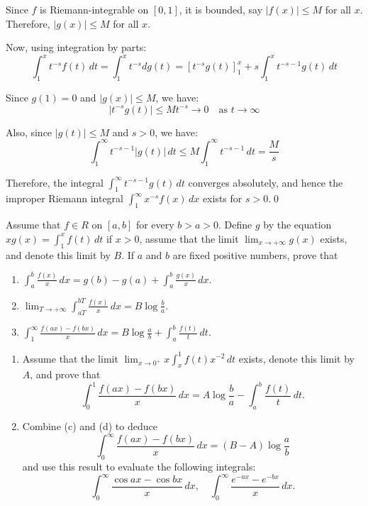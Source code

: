 Since $f$ is Riemann-integrable on $[0, 1]$, it is bounded, say $|f(x)| \leq M$ for all $x$. Therefore, $|g(x)| \leq M$ for all $x$.

Now, using integration by parts:
\[\int_{1}^{x} t^{-s} f(t) \, dt = \int_{1}^{x} t^{-s} dg(t) = \left[t^{-s} g(t)\right]_{1}^{x} + s \int_{1}^{x} t^{-s-1} g(t) \, dt\]

Since $g(1) = 0$ and $|g(x)| \leq M$, we have:
\[\left|t^{-s} g(t)\right| \leq M t^{-s} \to 0 \quad \text{as } t \to \infty\]

Also, since $|g(t)| \leq M$ and $s > 0$, we have:
\[\int_{1}^{\infty} t^{-s-1} |g(t)| \, dt \leq M \int_{1}^{\infty} t^{-s-1} \, dt = \frac{M}{s}\]

Therefore, the integral $\int_{1}^{\infty} t^{-s-1} g(t) \, dt$ converges absolutely, and hence the improper Riemann integral $\int_{1}^{\infty} x^{-s} f(x) \, dx$ exists for $s > 0$.\qed


\begin{problembox}
Assume that $f \in R$ on $[a, b]$ for every $b > a > 0$. Define $g$ by the equation $xg(x) = \int_{1}^{x} f(t) \, dt$ if $x > 0$, assume that the limit $\lim_{x \to +\infty} g(x)$ exists, and denote this limit by $B$. If $a$ and $b$ are fixed positive numbers, prove that
\begin{enumerate}[label=(\alph*)]
    \item $\int_{a}^{b} \frac{f(x)}{x} \, dx = g(b) - g(a) + \int_{a}^{b} \frac{g(x)}{x} \, dx.$
    \item $\lim_{T \to +\infty} \int_{aT}^{bT} \frac{f(x)}{x} \, dx = B \log \frac{b}{a}.$
    \item $\int_{1}^{\infty} \frac{f(ax) - f(bx)}{x} \, dx = B \log \frac{a}{b} + \int_{a}^{b} \frac{f(t)}{t} \, dt.$
\end{enumerate}
\begin{enumerate}[label=(\alph*),resume]
    \item Assume that the limit $\lim_{x \to 0^+} x \int_{x}^{1} f(t)x^{-2} \, dt$ exists, denote this limit by $A$, and prove that
    \[\int_{0}^{1} \frac{f(ax) - f(bx)}{x} \, dx = A \log \frac{b}{a} - \int_{a}^{b} \frac{f(t)}{t} \, dt.\]
    \item Combine (c) and (d) to deduce
    \[\int_{0}^{\infty} \frac{f(ax) - f(bx)}{x} \, dx = (B - A) \log \frac{a}{b}\]
    and use this result to evaluate the following integrals:
    \[\int_{0}^{\infty} \frac{\cos ax - \cos bx}{x} \, dx, \quad \int_{0}^{\infty} \frac{e^{-ax} - e^{-bx}}{x} \, dx.\]
\end{enumerate}
\end{problembox}


